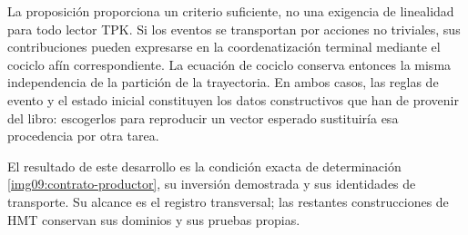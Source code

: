 La proposición proporciona un criterio suficiente, no una exigencia de
linealidad para todo lector TPK. Si los eventos se transportan por acciones
no triviales, sus contribuciones pueden expresarse en la coordenatización terminal
mediante el cociclo afín correspondiente. La ecuación de cociclo conserva
entonces la misma independencia de la partición de la trayectoria.
En ambos casos, las reglas de evento y el estado inicial constituyen los
datos constructivos que han de provenir del libro: escogerlos para
reproducir un vector esperado sustituiría esa procedencia por otra tarea.

El resultado de este desarrollo es la condición exacta de determinación
\eqref{img09:contrato-productor}, su inversión demostrada y sus identidades
de transporte. Su alcance es el registro transversal; las restantes
construcciones de HMT conservan sus dominios y sus pruebas propias.
